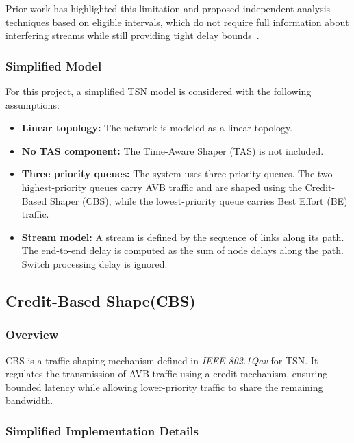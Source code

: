 Prior work has highlighted this limitation and proposed independent analysis techniques based on eligible intervals, which do not require full information about interfering streams while still providing tight delay bounds~\cite{Cao2016-IndependentTightWCRT, Cao2018-IndependentWCRTAnalysis}.

\subsubsection{Simplified Model}

For this project, a simplified TSN model is considered with the following assumptions:

\begin{itemize}

\item \textbf{Linear topology:} The network is modeled as a linear topology.

\item \textbf{No TAS component:} The Time-Aware Shaper (TAS) is not included.

\item \textbf{Three priority queues:}  
The system uses three priority queues. The two highest-priority queues carry AVB traffic and are shaped using the Credit-Based Shaper (CBS), while the lowest-priority queue carries Best Effort (BE) traffic.

\item \textbf{Stream model:} 
A stream is defined by the sequence of links along its path. 
The end-to-end delay is computed as the sum of node delays along the path. 
Switch processing delay is ignored.

\end{itemize}

\subsection{Credit-Based Shape(CBS)}

\subsubsection{Overview}
CBS is a traffic shaping mechanism defined in \textit{IEEE 802.1Qav} for TSN. 
It regulates the transmission of AVB traffic using a credit mechanism, 
ensuring bounded latency while allowing lower-priority traffic to share 
the remaining bandwidth.

\subsubsection{Simplified Implementation Details}

